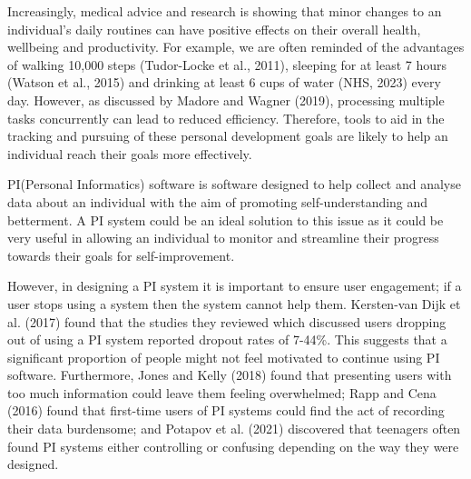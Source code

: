 \documentclass[12pt]{article}
\begin{document}
Increasingly, medical advice and research is showing that minor changes to an
individual’s daily routines can have positive effects on their overall health,
wellbeing and productivity. For example, we are often reminded of the
advantages of walking 10,000 steps (Tudor-Locke et al., 2011), sleeping for at
least 7 hours (Watson et al., 2015) and drinking at least 6 cups of water (NHS,
2023) every day. However, as discussed by Madore and Wagner (2019), processing
multiple tasks concurrently can lead to reduced efficiency. Therefore, tools to
aid in the tracking and pursuing of these personal development goals are likely
to help an individual reach their goals more effectively.\par

PI(Personal Informatics) software is software designed to help collect and
analyse data about an individual with the aim of promoting self-understanding
and betterment. A PI system could be an ideal solution to this issue as it
could be very useful in allowing an individual to monitor and streamline their
progress towards their goals for self-improvement.\par

However, in designing a PI system it is important to ensure user engagement; if
a user stops using a system then the system cannot help them. Kersten-van Dijk
et al. (2017) found that the studies they reviewed which discussed users
dropping out of using a PI system reported dropout rates of 7-44\%. This
suggests that a significant proportion of people might not feel motivated to
continue using PI software. Furthermore, Jones and Kelly (2018) found that
presenting users with too much information could leave them feeling
overwhelmed; Rapp and Cena (2016) found that first-time users of PI systems
could find the act of recording their data burdensome; and Potapov et al.
(2021) discovered that teenagers often found PI systems either controlling or
confusing depending on the way they were designed.\par
\end{document}
